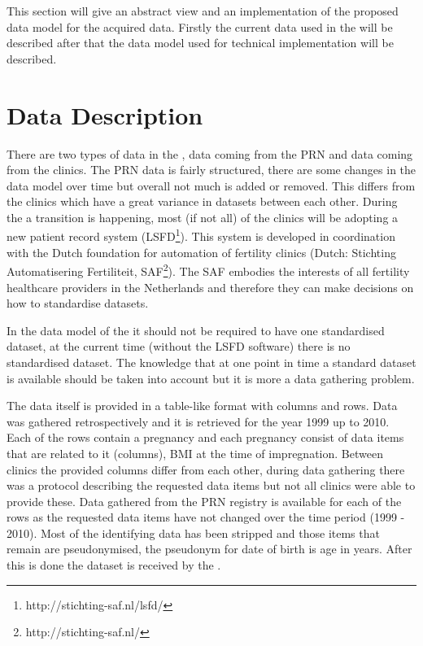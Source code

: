 This section will give an abstract view and an implementation of the proposed data model for the acquired data.
Firstly the current data used in the \project{} will be described after that the data model used for technical implementation will be described.

\section{Data Description}
\label{datamodel-data-description}

There are two types of data in the \project{}, data coming from the PRN and data coming from the clinics.
The PRN data is fairly structured, there are some changes in the data model over time but overall not much is added or removed.
This differs from the clinics which have a great variance in datasets between each other.
During the \project{} a transition is happening, most (if not all) of the clinics will be adopting a new patient record system (LSFD\footnote{http://stichting-saf.nl/lsfd/}).
This system is developed in coordination with the Dutch foundation for automation of fertility clinics (Dutch: Stichting Automatisering Fertiliteit, SAF\footnote{http://stichting-saf.nl/}).
The SAF embodies the interests of all fertility healthcare providers in the Netherlands and therefore they can make decisions on how to standardise datasets.

In the data model of the \ivfsystem{} it should not be required to have one standardised dataset, at the current time (without the LSFD software) there is no standardised dataset.
The knowledge that at one point in time a standard dataset is available should be taken into account but it is more a data gathering problem.

The data itself is provided in a table-like format with columns and rows.
Data was gathered retrospectively and it is retrieved for the year 1999 up to 2010.
Each of the rows contain a pregnancy and each pregnancy consist of data items that are related to it (columns), \eg{} BMI at the time of impregnation.
Between clinics the provided columns differ from each other, during data gathering there was a protocol describing the requested data items but not all clinics were able to provide these.
Data gathered from the PRN registry is available for each of the rows as the requested data items have not changed over the time period (1999 - 2010).
Most of the identifying data has been stripped and those items that remain are pseudonymised, \eg{} the pseudonym for date of birth is age in years.
After this is done the dataset is received by the \ivfsystem{}.

